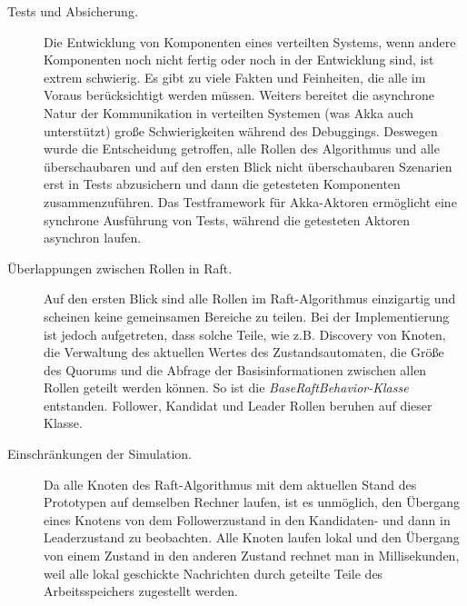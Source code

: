 \begin{description} 
	\item[Tests und Absicherung.] Die Entwicklung von Komponenten eines verteilten Systems, wenn andere Komponenten noch nicht fertig oder noch in der Entwicklung sind, ist extrem schwierig. Es gibt zu viele Fakten und Feinheiten, die alle im Voraus berücksichtigt werden müssen. Weiters bereitet die asynchrone Natur der Kommunikation in verteilten Systemen (was Akka auch unterstützt) große Schwierigkeiten während des Debuggings. Deswegen wurde die Entscheidung getroffen, alle Rollen des Algorithmus und alle überschaubaren und auf den ersten Blick nicht überschaubaren Szenarien erst in Tests abzusichern und dann die getesteten Komponenten zusammenzuführen. Das Testframework für Akka-Aktoren ermöglicht eine synchrone Ausführung von Tests, während die getesteten Aktoren asynchron laufen.
	
	\item[Überlappungen zwischen Rollen in Raft.] Auf den ersten Blick sind alle Rollen im Raft-Algorithmus einzigartig und scheinen keine gemeinsamen Bereiche zu teilen. Bei der Implementierung ist jedoch aufgetreten, dass solche Teile, wie z.B. Discovery von Knoten, die Verwaltung des aktuellen Wertes des Zustandsautomaten, die Größe des Quorums und die Abfrage der Basisinformationen zwischen allen Rollen geteilt werden können. So ist die \textit{BaseRaftBehavior-Klasse} entstanden. Follower, Kandidat und Leader Rollen beruhen auf dieser Klasse.
	
	\item[Einschränkungen der Simulation.] Da alle Knoten des Raft-Algorithmus mit dem aktuellen Stand des Prototypen auf demselben Rechner laufen, ist es unmöglich, den Übergang eines Knotens von dem Followerzustand in den Kandidaten- und dann in Leaderzustand zu beobachten. Alle Knoten laufen lokal und den Übergang von einem Zustand in den anderen Zustand rechnet man in Millisekunden, weil alle lokal geschickte Nachrichten durch geteilte Teile des Arbeitsspeichers zugestellt werden.
	

\end{description}
